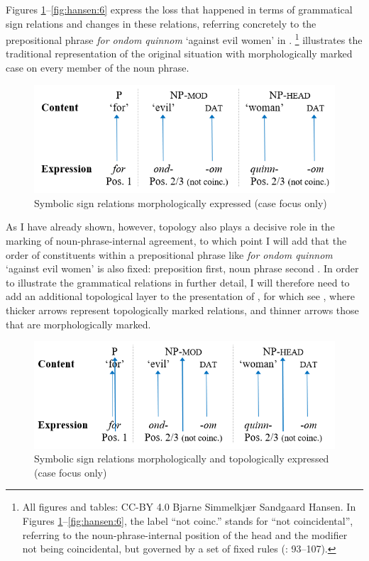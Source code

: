 \documentclass[output=paper]{langsci/langscibook}
\begin{document}
Figures \ref{fig:hansen:1}--\ref{fig:hansen:6} express the loss that happened in terms of grammatical sign relations and changes in these relations, referring concretely to the prepositional phrase \textit{for ondom quinnom} ‘against evil women’ in . \footnote{All figures and tables: CC-BY 4.0 Bjarne Simmelkjær Sandgaard Hansen. In Figures \ref{fig:hansen:1}--\ref{fig:hansen:6}, the label “not coinc.” stands for “not coincidental”, referring to the noun-phrase-internal position of the head and the modifier not being coincidental, but governed by a set of fixed rules (\citealt{Diderichsen1941}: 93–107).} illustrates the traditional representation of the original situation with morphologically marked case on every member of the noun phrase.


\begin{figure}
	\caption{Symbolic sign relations morphologically expressed (case focus only)\label{fig:hansen:1}}
	\includegraphics[width=.75\textwidth]{figures/Hansen-fig1.PNG}
\end{figure}


As I have already shown, however, topology also plays a decisive role in the marking of noun-phrase-internal agreement, to which point I will add that the order of constituents within a prepositional phrase like \textit{for ondom quinnom} ‘against evil women’ is also fixed: preposition first, noun phrase second \citep[109]{Diderichsen1941}. In order to illustrate the grammatical relations in further detail, I will therefore need to add an additional topological layer to the presentation of , for which see , where thicker arrows represent topologically marked relations, and thinner arrows those that are morphologically marked.


\begin{figure}
	\caption{Symbolic sign relations morphologically and topologically expressed (case focus only)\label{fig:hansen:2}}
	\includegraphics[width=.75\textwidth]{figures/Hansen-fig2.PNG}
\end{figure}
\end{document}
